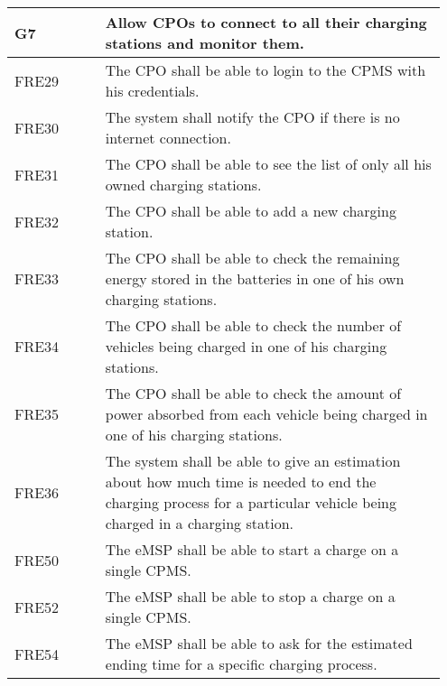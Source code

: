 \begin{longtable}{|p{0.20\linewidth}p{0.75\linewidth}|}
    \hline
    \rowcolor{bluepoli!40}\textbf{G7} & \textbf{Allow CPOs to connect to all their charging stations and monitor them.} \\
    \hline
    \rowcolor{bluepoli!15} FRE29 & The CPO shall be able to login to the CPMS with his credentials.\\
    \hline
    \rowcolor{bluepoli!15} FRE30 &  The system shall notify the CPO if there is no internet connection.\\
    \hline
    \rowcolor{bluepoli!15} FRE31 & The CPO shall be able to see the list of only all his owned charging stations.\\
    \hline
    \rowcolor{bluepoli!15} FRE32& The CPO shall be able to add a new charging station.\\
    \hline
    \rowcolor{bluepoli!15} FRE33 & The CPO shall be able to check the remaining energy stored in the batteries in one of his own charging stations.\\
    \hline
    \rowcolor{bluepoli!15} FRE34& The CPO shall be able to check the number of vehicles being charged in one of his charging stations.\\
    \hline
    \rowcolor{bluepoli!15} FRE35& The CPO shall be able to check the amount of power absorbed from each vehicle being charged in one of his charging stations.\\
    \hline
    \rowcolor{bluepoli!15} FRE36& The system shall be able to give an estimation about how much time is needed to end the charging process for a particular vehicle being charged in a charging station.\\
    \hline
    \rowcolor{bluepoli!15} FRE50 & The eMSP shall be able to start a charge on a single CPMS.\\
    \hline
    \rowcolor{bluepoli!15} FRE52 & The eMSP shall be able to stop a charge on a single CPMS.\\
    \hline
    \rowcolor{bluepoli!15} FRE54& The eMSP shall be able to ask for the estimated ending time for a specific charging process.\\
    \hline

\end{longtable}

